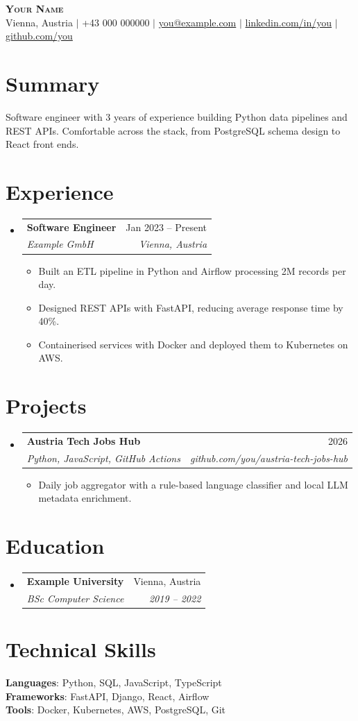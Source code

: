 \documentclass[letterpaper,11pt]{article}
\makeatletter
\newcommand{\resumeItem}[1]{\item\small{#1 \vspace{-2pt}}}
\newcommand{\resumeSubheading}[4]{
  \vspace{-2pt}\item
    \begin{tabular*}{0.97\textwidth}[t]{l@{\extracolsep{\fill}}r}
      \textbf{#1} & #2 \\
      \textit{\small#3} & \textit{\small #4} \\
    \end{tabular*}\vspace{-7pt}
}
\newcommand{\resumeSubHeadingListStart}{\begin{itemize}[leftmargin=0.15in, label={}]}
\newcommand{\resumeSubHeadingListEnd}{\end{itemize}}
\newcommand{\resumeItemListStart}{\begin{itemize}}
\newcommand{\resumeItemListEnd}{\end{itemize}\vspace{-5pt}}
\makeatother
\begin{document}
\begin{center}
  \textbf{\Huge \scshape Your Name} \\ \vspace{1pt}
  \small Vienna, Austria $|$ +43 000 000000 $|$
  \href{mailto:you@example.com}{you@example.com} $|$
  \href{https://linkedin.com/in/you}{linkedin.com/in/you} $|$
  \href{https://github.com/you}{github.com/you}
\end{center}

\section{Summary}
Software engineer with 3 years of experience building Python data pipelines and REST APIs.
Comfortable across the stack, from PostgreSQL schema design to React front ends.

\section{Experience}
\resumeSubHeadingListStart
  \resumeSubheading
    {Software Engineer}{Jan 2023 -- Present}
    {Example GmbH}{Vienna, Austria}
    \resumeItemListStart
      \resumeItem{Built an ETL pipeline in Python and Airflow processing 2M records per day.}
      \resumeItem{Designed REST APIs with FastAPI, reducing average response time by 40\%.}
      \resumeItem{Containerised services with Docker and deployed them to Kubernetes on AWS.}
    \resumeItemListEnd
\resumeSubHeadingListEnd

\section{Projects}
\resumeSubHeadingListStart
  \resumeSubheading
    {Austria Tech Jobs Hub}{2026}
    {Python, JavaScript, GitHub Actions}{github.com/you/austria-tech-jobs-hub}
    \resumeItemListStart
      \resumeItem{Daily job aggregator with a rule-based language classifier and local LLM metadata enrichment.}
    \resumeItemListEnd
\resumeSubHeadingListEnd

\section{Education}
\resumeSubHeadingListStart
  \resumeSubheading
    {Example University}{Vienna, Austria}
    {BSc Computer Science}{2019 -- 2022}
\resumeSubHeadingListEnd

\section{Technical Skills}
\begin{itemize}[leftmargin=0.15in, label={}]
  \small{\item{
    \textbf{Languages}{: Python, SQL, JavaScript, TypeScript} \\
    \textbf{Frameworks}{: FastAPI, Django, React, Airflow} \\
    \textbf{Tools}{: Docker, Kubernetes, AWS, PostgreSQL, Git}
  }}
\end{itemize}
\end{document}

